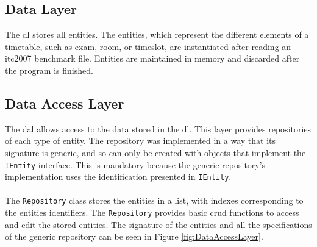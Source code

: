 \subsection{Data Layer}

The \gls{dl} stores all entities. The entities, which represent the different elements of a timetable, such as exam, room, or timeslot, are instantiated after reading an \gls{itc2007} benchmark file. Entities are maintained in memory and discarded after the program is finished.

\subsection{Data Access Layer}

The \gls{dal} allows access to the data stored in the \gls{dl}. This layer provides repositories of each type of entity. The repository was implemented in a way that its signature is generic, and so can only be created with objects that implement the \verb+IEntity+ interface. This is mandatory because the generic repository's implementation uses the identification presented in \verb+IEntity+. \\
\\
The \verb+Repository+ class stores the entities in a list, with indexes corresponding to the entities identifiers. The \verb+Repository+ provides basic \gls{crud} functions to access and edit the stored entities. The signature of the entities and all the specifications of the generic repository can be seen in Figure \ref{fig:DataAccessLayer}.\\

